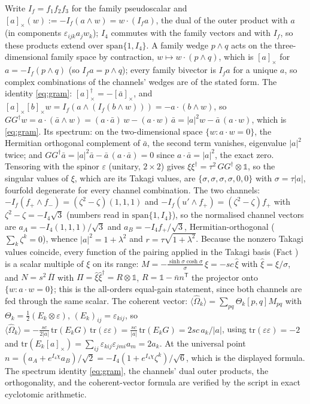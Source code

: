 Write $I_{f} = f_{1}f_{2}f_{3}$ for the family pseudoscalar and $[a]_{\times}(w) := -I_{f}(a \wedge w) = w \cdot (I_{f}a)$, the dual of the outer product with $a$ (in components $\varepsilon_{ijk}a_{j}w_{k}$); $I_4$ commutes with the family vectors and with $I_{f}$, so these products extend over $\mathrm{span}\{1, I_4\}$. A family wedge $p \wedge q$ acts on the three-dimensional family space by contraction, $w \mapsto w \cdot (p \wedge q)$, which is $[a]_{\times}$ for $a = -I_{f}(p \wedge q)$ (so $I_{f}a = p \wedge q$); every family bivector is $I_{f}a$ for a unique $a$, so complex combinations of the channels' wedges are of the stated form. The identity \eqref{eq:gram}: $[a]_{\times}^{\dagger} = -[\bar a]_{\times}$, and $[a]_{\times}[b]_{\times}w = I_{f}(a \wedge (I_{f}(b \wedge w))) = -a \cdot (b \wedge w)$, so $GG^{\dagger}w = a \cdot (\bar a \wedge w) = (a \cdot \bar a)\,w - (a \cdot w)\,\bar a = |a|^{2}w - \bar{a}\,(a \cdot w)$, which is \eqref{eq:gram}. Its spectrum: on the two-dimensional space $\{w : a \cdot w = 0\}$, the Hermitian orthogonal complement of $\bar a$, the second term vanishes, eigenvalue $|a|^{2}$ twice; and $GG^{\dagger}\bar{a} = |a|^{2}\bar{a} - \bar{a}\,(a \cdot \bar{a}) = 0$ since $a \cdot \bar{a} = |a|^{2}$, the exact zero. Tensoring with the spinor $\varepsilon$ (unitary, $2 \times 2$) gives $\xi\xi^{\dagger} = \tau^{2}\,GG^{\dagger} \otimes \mathbb{1}$, so the singular values of $\xi$, which are its Takagi values, are $\{\sigma, \sigma, \sigma, \sigma, 0, 0\}$ with $\sigma = \tau|a|$, fourfold degenerate for every channel combination. The two channels: $-I_{f}(f_{+} \wedge f_{-}) = (\zeta^{2} - \zeta)(1,1,1)$ and $-I_{f}(u' \wedge f_{+}) = (\zeta^{2} - \zeta)f_{+}$ with $\zeta^{2} - \zeta = -I_4\sqrt{3}$ (numbers read in $\mathrm{span}\{1, I_4\}$), so the normalised channel vectors are $a_{A} = -I_4(1,1,1)/\sqrt{3}$ and $a_{B} = -I_4 f_{+}/\sqrt{3}$, Hermitian-orthogonal ($\sum_{k}\zeta^{k} = 0$), whence $|a|^{2} = 1 + \lambda^{2}$ and $r = \tau\sqrt{1+\lambda^{2}}$. Because the nonzero Takagi values coincide, every function of the pairing applied in the Takagi basis (Fact ) is a scalar multiple of $\xi$ on its range: $M = -\tfrac{\sinh\sigma\cosh\sigma}{\sigma}\,\xi = -sc\,\hat\xi$ with $\hat\xi = \xi/\sigma$, and $N = s^{2}\,\overline{\Pi}$ with $\Pi = \hat\xi\hat\xi^{\dagger} = R \otimes \mathbb{1}$, $R = \mathbb{1} - \bar{n}n^{\mathsf{T}}$ the projector onto $\{w : a \cdot w = 0\}$; this is the all-orders equal-gain statement, since both channels are fed through the same scalar. The coherent vector: $\langle\hat\Omega_{k}\rangle = \sum_{pq}\Theta_{k}[p,q]M_{pq}$ with $\Theta_{k} = \tfrac12(E_{k} \otimes \varepsilon)$, $(E_{k})_{ij} = \varepsilon_{kij}$, so $\langle\hat\Omega_{k}\rangle = -\tfrac{sc}{2|a|}\,\mathrm{tr}(E_{k}G)\,\mathrm{tr}(\varepsilon\varepsilon) = \tfrac{sc}{|a|}\,\mathrm{tr}(E_{k}G) = 2sc\,a_{k}/|a|$, using $\mathrm{tr}(\varepsilon\varepsilon) = -2$ and $\mathrm{tr}(E_{k}[a]_{\times}) = \sum_{ij}\varepsilon_{kij}\varepsilon_{jmi}a_{m} = 2a_{k}$. At the universal point $n = (a_{A} + e^{I_4\chi}a_{B})/\sqrt{2} = -I_4(1 + e^{I_4\chi}\zeta^{k})/\sqrt{6}$, which is the displayed formula. The spectrum identity \eqref{eq:gram}, the channels' dual outer products, the orthogonality, and the coherent-vector formula are verified by the script in exact cyclotomic arithmetic.
